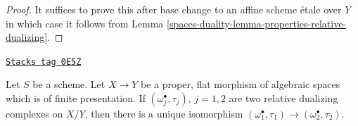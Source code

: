 \begin{proof}
It suffices to prove this after base change to an affine scheme \'etale
over $Y$ in which case it follows from
Lemma \ref{spaces-duality-lemma-properties-relative-dualizing}.
\end{proof}

\begin{lemma}
\label{spaces-duality-lemma-uniqueness-relative-dualizing}
\href{https://stacks.math.columbia.edu/tag/0E5Z}{\texttt{Stacks tag 0E5Z}}

Let $S$ be a scheme. Let $X \to Y$ be a proper, flat morphism of
algebraic spaces which is of finite presentation.
If $(\omega_j^\bullet, \tau_j)$, $j = 1, 2$
are two relative dualizing complexes on $X/Y$,
then there is a unique isomorphism
$(\omega_1^\bullet, \tau_1) \to (\omega_2^\bullet, \tau_2)$.
\end{lemma}

